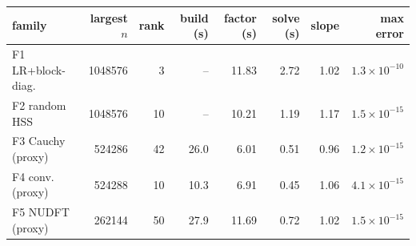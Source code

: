 \begin{tabular}{@{}lrrrrrrr@{}}
\toprule
family & largest $n$ & rank & build (s) & factor (s) & solve (s) & slope & max error\\
\midrule
F1 LR+block-diag. & 1048576 & 3 & -- & 11.83 & 2.72 & 1.02 & $1.3{\times}10^{-10}$\\
F2 random HSS & 1048576 & 10 & -- & 10.21 & 1.19 & 1.17 & $1.5{\times}10^{-15}$\\
F3 Cauchy (proxy) & 524286 & 42 & 26.0 & 6.01 & 0.51 & 0.96 & $1.2{\times}10^{-15}$\\
F4 conv. (proxy) & 524288 & 10 & 10.3 & 6.91 & 0.45 & 1.06 & $4.1{\times}10^{-15}$\\
F5 NUDFT (proxy) & 262144 & 50 & 27.9 & 11.69 & 0.72 & 1.02 & $1.5{\times}10^{-15}$\\
\bottomrule
\end{tabular}
